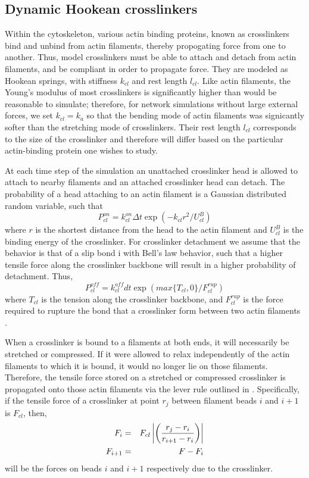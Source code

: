\documentclass[12pt]{article}
\begin{document}
\subsection{Dynamic Hookean crosslinkers}
Within the cytoskeleton, various actin binding proteins, known as crosslinkers 
bind and unbind from actin filaments, thereby propogating force from one to
another. Thus, model crosslinkers must be able to attach and detach from actin filaments,
and be compliant in order to propagate force. They are modeled as Hookean springs, with stiffness
$k_{cl}$ and rest length $l_{cl}$. Like actin filaments, the Young's modulus of
most crosslinkers is significantly higher than would be reasonable to simulate; 
therefore, for network simulations without large external forces, we set $k_{cl}=k_a$ 
so that the bending mode of actin filaments was signicantly softer than the stretching mode of
crosslinkers. Their rest length $l_{cl}$ corresponds to the size of the crosslinker
and therefore will differ based on the particular actin-binding protein one wishes to study.
\par
At each time step of the simulation an unattached crosslinker head is allowed to attach to nearby
filaments and an attached crosslinker head can detach. 
The probability of a head attaching to an actin filament is a Gaussian distributed random variable, such that
\begin{equation}
  P_{cl}^{on} = k_{cl}^{on}\Delta t\exp(-k_{cl}r^2/U_{cl}^B)
  \label{eqn:cl_on}
\end{equation} 
where $r$ is the shortest distance from the head to the actin filament and $U_{cl}^B$ 
is the binding energy of the crosslinker. 
For crosslinker detachment we assume that the behavior is that of a slip bond i
with Bell's law behavior, such that a higher
tensile force along the crosslinker backbone will result in a higher probability of detachment\cite{bell1978}. Thus, 
\begin{equation}
  P_{cl}^{off} = k_{cl}^{off} dt\exp{\left(max\{T_{cl},0\}/F_{cl}^{rup}\right)}
  \label{eqn:cl_off}
\end{equation}
where $T_{cl}$ is the tension along the crosslinker backbone, and $F_{cl}^{rup}$
is the force required to rupture the bond that a crosslinker form between two 
actin filaments \cite{ferrer2008}. 
\par
When a crosslinker is bound to a filaments at both ends, it will necessarily be stretched or compressed. 
If it were allowed to relax independently of the actin filaments to which it is bound, 
it would no longer lie on those filaments. Therefore, the tensile force stored on a stretched or compressed
crosslinker is propagated onto those actin filaments via the lever rule outlined in 
\cite{nedelec2002, gordon2012}. Specifically, if the tensile force of a crosslinker at point $r_j$ between 
filament beads $i$ and $i+1$ is $F_{cl}$, then, 
\begin{eqnarray} 
  F_i &=& F_{cl}\left|\left( {r_j - r_i \over r_{i+1} - r_i }\right)\right|\\\nonumber
  F_{i+1} &=& F-F_i 
  \label{eqn:lever}
\end{eqnarray}
will be the forces on beads $i$ and $i+1$ respectively due to the crosslinker.
\end{document}
